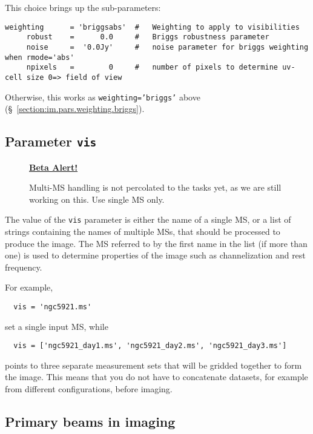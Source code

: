This choice brings up the sub-parameters:
\small
\begin{verbatim}
weighting      = 'briggsabs'  #   Weighting to apply to visibilities 
     robust    =      0.0     #   Briggs robustness parameter
     noise     =  '0.0Jy'     #   noise parameter for briggs weighting when rmode='abs'
     npixels   =        0     #   number of pixels to determine uv-cell size 0=> field of view
\end{verbatim}
\normalsize

Otherwise, this works as {\tt weighting='briggs'} above 
(\S~\ref{section:im.pars.weighting.briggs}).

\subsection{Parameter {\tt vis} }
\label{section:im.pars.vis}

\begin{wrapfigure}{r}{2.5in}
  \begin{boxedminipage}{2.5in}
     \centerline{\underline{\bf Beta Alert!}}
     Multi-MS handling is not percolated to the tasks yet, as
     we are still working on this.  Use single MS only.
  \end{boxedminipage}
\end{wrapfigure}

The value of the {\tt vis} parameter is either the name of a single
MS, or a list of strings containing the names of multiple MSs, that
should be processed to produce the image.  The MS referred to by the
first name in the list (if more than one) is used to determine
properties of the image such as channelization and rest frequency.

For example,
\small
\begin{verbatim}
  vis = 'ngc5921.ms'
\end{verbatim}
\normalsize
set a single input MS, while
\small
\begin{verbatim}
  vis = ['ngc5921_day1.ms', 'ngc5921_day2.ms', 'ngc5921_day3.ms']
\end{verbatim}
\normalsize
points to three separate measurement sets that will be gridded
together to form the image.  This means that you do not have
to concatenate datasets, for example from different configurations,
before imaging.

\subsection{Primary beams in imaging }
\label{section:im.pars.pb}

